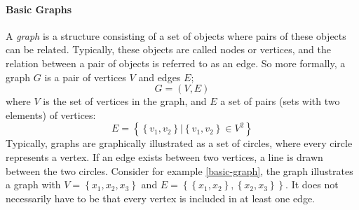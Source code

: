 \paragraph{Basic Graphs}
A \emph{graph} is a structure consisting of a set of objects where pairs of these objects can be related. Typically, these objects are called nodes or vertices, and the relation between a pair of objects is referred to as an edge. So more formally, a graph $G$ is a pair of vertices $V$ and edges $E$;
\begin{equation}
	G = (V, E)
\end{equation}
where $V$ is the set of vertices in the graph, and $E$ a set of pairs (sets with two elements) of vertices:
\begin{equation}
	E = \left\{\left\{v_1, v_2\right\} | \left\{v_1, v_2\right\} \in V^2\right\}
	\label{undirected-edges}
\end{equation}
Typically, graphs are graphically illustrated as a set of circles, where every circle represents a vertex. If an edge exists between two vertices, a line is drawn between the two circles. Consider for example \cref{basic-graph}, the graph illustrates a graph with $V = \left\{x_1, x_2, x_3\right\}$ and $E = \left\{\left\{x_1, x_2\right\}, \left\{x_2, x_3\right\}\right\}$. It does not necessarily have to be that every vertex is included in at least one edge.

